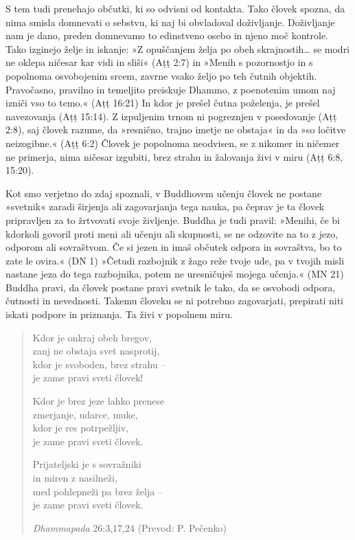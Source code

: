 S tem tudi prenehajo občutki, ki so odvisni od kontakta. Tako človek
spozna, da nima smisla domnevati o sebstvu, ki naj bi obvladoval
doživljanje. Doživljanje nam je dano, preden domnevamo to edinstveno
osebo in njeno moč kontrole. Tako izginejo želje in iskanje: »Z
opuščanjem želja po obeh skrajnostih\ldots{} se modri ne oklepa ničesar
kar vidi in sliši« (Aṭṭ 2:7) in »Menih s pozornostjo in s popolnoma
osvobojenim srcem, zavrne vsako željo po teh čutnih objektih.
Pravočasno, pravilno in temeljito preiskuje Dhammo, z poenotenim umom
naj izniči vso to temo.« (Aṭṭ 16:21) In kdor je prešel čutna poželenja,
je prešel navezovanja (Aṭṭ 15:14). Z izpuljenim trnom ni pogreznjen v
posedovanje (Aṭṭ 2:8), saj človek razume, da »resnično, trajno imetje ne
obstaja« in da »so ločitve neizogibne.« (Aṭṭ 6:2) Človek je popolnoma
neodvisen, se z nikomer in ničemer ne primerja, nima ničesar izgubiti,
brez strahu in žalovanja živi v miru (Aṭṭ 6:8, 15:20).

Kot smo verjetno do zdaj spoznali, v Buddhovem učenju človek ne
postane »svetnik« zaradi širjenja ali zagovarjanja tega nauka, pa
čeprav je ta človek pripravljen za to žrtvovati svoje življenje. Buddha
je tudi pravil: »Menihi, če bi kdorkoli govoril proti meni ali učenju
ali skupnosti, se ne odzovite na to z jezo, odporom ali sovraštvom. Če
si jezen in imaš občutek odpora in sovraštva, bo to zate le ovira.« (DN
1) »Četudi razbojnik z žago reže tvoje ude, pa v tvojih misli nastane
jeza do tega razbojnika, potem ne uresničuješ mojega učenja.« (MN 21)
Buddha pravi, da človek postane pravi svetnik le tako, da se osvobodi
odpora, čutnosti in nevednosti. Takemu človeku se ni potrebno
zagovarjati, prepirati niti iskati podpore in priznanja. Ta živi v
popolnem miru.

\vspace*{-0.5\baselineskip}
{\setlength{\stanzaskip}{0.5\baselineskip}
\begin{verse}

Kdor je onkraj obeh bregov,\\
zanj ne obstaja svet nasprotij,\\
kdor je svoboden, brez strahu --\\
je zame pravi sveti človek!

Kdor je brez jeze lahko prenese\\
zmerjanje, udarce, muke,\\
kdor je res potrpežljiv,\\
je zame pravi sveti človek.

Prijateljski je s sovražniki\\
in miren z nasilneži,\\
med pohlepneži pa brez želja --\\
je zame pravi sveti človek.

\emph{Dhammapada} 26:3,17,24 (Prevod: P. Pečenko)
\end{verse}}

